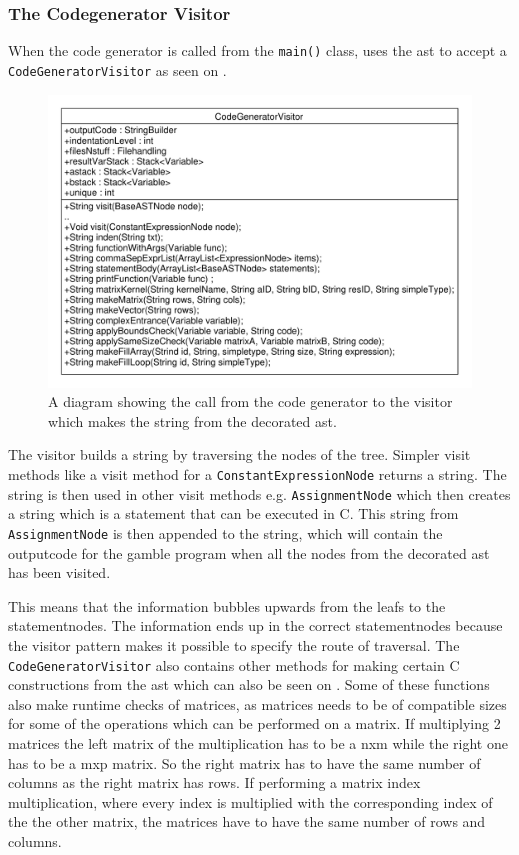 \subsubsection*{The Codegenerator Visitor}
When the code generator is called from the \texttt{main()} class, uses the \acrshort{ast} to accept a \texttt{CodeGeneratorVisitor} as seen on .

\begin{figure}[!ht]
\centering
 \includegraphics[width=1\textwidth]{figures/ClassDiagrams/CodeGeneratorCall.pdf} %
\caption{A diagram showing the call from the code generator to the visitor which makes the string from the decorated \acrshort{ast}.}\label{fig:CodeGeneratorVisitor}
\vspace{-15pt}
\end{figure}

The visitor builds a string by traversing the nodes of the tree.
Simpler visit methods like a visit method for a \texttt{ConstantExpressionNode} returns a string.
The string is then used in other visit methods e.g. \texttt{AssignmentNode} which then creates a string which is a statement that can be executed in C.
This string from \texttt{AssignmentNode} is then appended to the string, which will contain the outputcode for the \gls{gamble} program when all the nodes from the decorated \acrshort{ast} has been visited.

This means that the information bubbles upwards from the leafs to the statementnodes.
The information ends up in the correct statementnodes  because the visitor pattern makes it possible to specify the route of traversal.
The \texttt{CodeGeneratorVisitor} also contains other methods for making certain C constructions from the \acrshort{ast} which can also be seen on .
Some of these functions also make runtime checks of matrices, as matrices needs to be of compatible sizes for some of the operations which can be performed on a matrix.
If multiplying 2 matrices the left matrix of the multiplication has to be a nxm while the right one has to be a mxp matrix.
So the right matrix has to have the same number of columns as the right matrix has rows.
If performing a matrix index multiplication, where every index is multiplied with the corresponding index of the the other matrix, the matrices have to have the same number of rows and columns.

